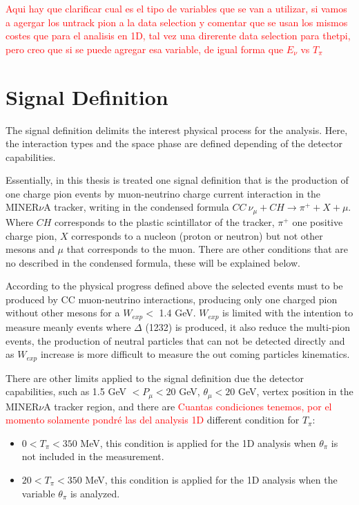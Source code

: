 \textcolor{red}{Aqui hay que clarificar cual es el tipo de variables que se van a utilizar, si vamos a agergar los untrack pion a la data selection y comentar que se usan los mismos costes que para el analisis en 1D, tal vez una direrente data selection para thetpi, pero creo que si se puede agregar esa variable, de igual forma que $E_\nu$ vs $T_\pi$}


\section{Signal Definition}
\label{Cap:Analysis:SignalDefinition}

The signal definition delimits the interest physical process for the analysis. Here, the interaction types and the space phase are defined depending of the detector capabilities.

Essentially, in this thesis is treated one signal definition that is the production of one charge pion events by muon-neutrino charge current interaction in the MINER$\nu$A tracker, writing in the condensed formula $CC\ \nu_\mu+CH\xrightarrow{}\pi^+ + X + \mu$. Where $CH$ corresponds to the plastic scintillator of the tracker, $\pi^+$ one positive charge pion, $X$ corresponds to a nucleon (proton or neutron) but not other mesons and $\mu$ that corresponds to the muon. There are other conditions that are no described in the condensed formula, these will be explained below. 

According to the physical progress defined above the selected events must to be produced by CC muon-neutrino interactions, producing only one charged pion without other mesons for a $W_{exp} <$ 1.4 GeV. $W_{exp}$ is limited with the intention to measure meanly events where $\Delta$ (1232) is produced, it also reduce the multi-pion events, the production of neutral particles that can not be detected directly and as $W_{exp}$ increase is more difficult to measure the out coming particles kinematics. 

There are other limits applied to the signal definition due the detector capabilities, such as 1.5 GeV $<P_\mu<20$ GeV, $\theta_\mu<20$ GeV, vertex position in the MINER$\nu$A tracker region, and there are \textcolor{red}{Cuantas condiciones tenemos, por el momento solamente pondr\'e las del analysis 1D} different condition for $T_\pi$:
\begin{itemize}
    \item $0<T_\pi<350$ MeV, this condition is applied for the 1D analysis when $\theta_\pi$ is not included in the measurement.  
    \item $20<T_\pi<350$ MeV, this condition is applied for the 1D analysis when the variable $\theta_\pi$ is analyzed. 
\end{itemize}

